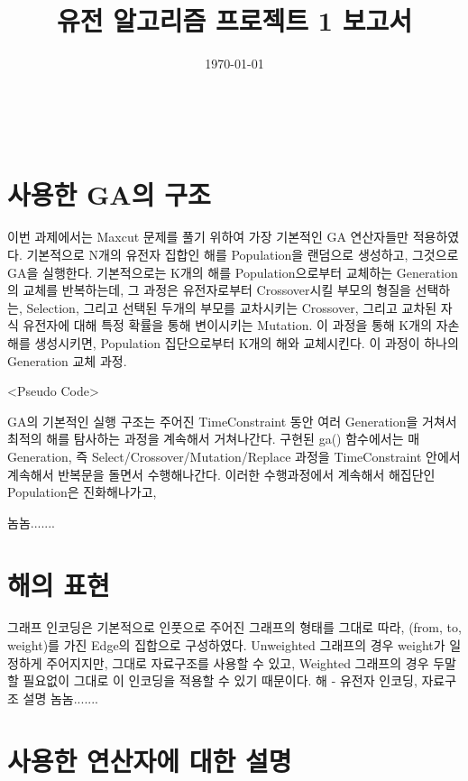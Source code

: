 \documentclass{article}
\begin{document}
\title{ 유전 알고리즘 프로젝트 1 보고서 }
\author{ }
\date{\today}
\maketitle


{~~}


\section{ 사용한 GA의 구조 }

이번 과제에서는 Maxcut 문제를 풀기 위하여 가장 기본적인 GA 연산자들만 적용하였다.
기본적으로 N개의 유전자 집합인 해를 Population을 랜덤으로 생성하고, 그것으로 GA을 실행한다.
기본적으로는 K개의 해를 Population으로부터 교체하는 Generation의 교체를 반복하는데, 그 과정은 유전자로부터 Crossover시킬 부모의 형질을 선택하는, Selection, 그리고 선택된 두개의 부모를 교차시키는 Crossover, 그리고 교차된 자식 유전자에 대해 특정 확률을 통해 변이시키는 Mutation. 이 과정을 통해 K개의 자손 해를 생성시키면, Population 집단으로부터 K개의 해와 교체시킨다. 이 과정이 하나의 Generation 교체 과정.

<Pseudo Code>

GA의 기본적인 실행 구조는 주어진 TimeConstraint 동안 여러 Generation을 거쳐서 최적의 해를 탐사하는 과정을 계속해서 거쳐나간다. 구현된 ga() 함수에서는 매 Generation, 즉 Select/Crossover/Mutation/Replace 과정을 TimeConstraint 안에서 계속해서 반복문을 돌면서 수행해나간다. 이러한 수행과정에서 계속해서 해집단인 Population은 진화해나가고, 

놈놈.......


\section{ 해의 표현 }

그래프 인코딩은 기본적으로 인풋으로 주어진 그래프의 형태를 그대로 따라, (from, to, weight)를 가진 Edge의 집합으로 구성하였다. Unweighted 그래프의 경우 weight가 일정하게 주어지지만, 그대로 자료구조를 사용할 수 있고, Weighted 그래프의 경우 두말 할 필요없이 그대로 이 인코딩을 적용할 수 있기 때문이다.
해 - 유전자 인코딩, 
자료구조 설명
놈놈.......


\section{ 사용한 연산자에 대한 설명 }
\end{document}
